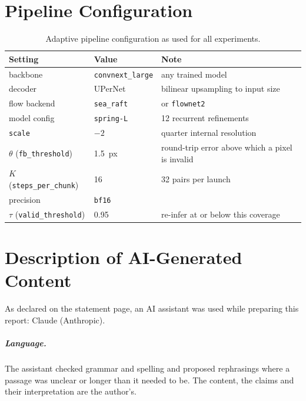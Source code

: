 \documentclass[report.tex]{subfiles}
\begin{document}
\chapter{Pipeline Configuration}
\label{app:repro}

\begin{table}[h]
    \centering
    \caption{Adaptive pipeline configuration as used for all experiments.}
    \label{tab:config}
    \footnotesize
    \begin{tabular}{@{}llp{54mm}@{}}
        \toprule
        \textbf{Setting} & \textbf{Value} & \textbf{Note} \\
        \midrule
        backbone            & \texttt{convnext\_large} & any trained model \\
        decoder             & UPerNet & bilinear upsampling to input size \\
        flow backend        & \texttt{sea\_raft} & or \texttt{flownet2} \\
        model config        & \texttt{spring-L} & 12 recurrent refinements \\
        \texttt{scale}      & $-2$ & quarter internal resolution \\
        $\theta$ (\texttt{fb\_threshold}) & \SI{1.5}{px} & round-trip error
                                     above which a pixel is invalid \\
        $K$ (\texttt{steps\_per\_chunk}) & 16 & 32 pairs per launch \\
        precision           & \texttt{bf16} & \\
        $\tau$ (\texttt{valid\_threshold}) & 0.95 & re-infer at or below this
                                     coverage \\
        \bottomrule
    \end{tabular}
\end{table}

\chapter{Description of AI-Generated Content}
\label{app:ai}

As declared on the statement page, an AI assistant was used while preparing
this report: Claude (Anthropic).

\paragraph{Language.} The assistant checked grammar and spelling and proposed
rephrasings where a passage was unclear or longer than it needed to be. The
content, the claims and their interpretation are the author's.
\end{document}
